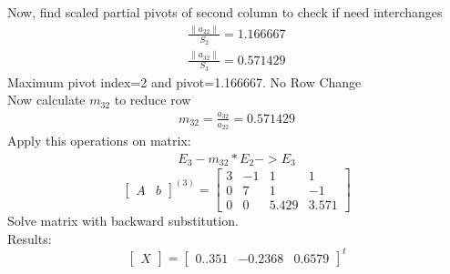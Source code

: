 \documentclass{article}
\begin{document}
Now, find scaled partial pivots of second column to check if need interchanges
\begin{align}
	\frac{\|a_{22}\|}{S_{2}}=1.166667\\
	\frac{\|a_{32}\|}{S_{3}}=0.571429
\end{align}
Maximum pivot index=2 and pivot=1.166667. No Row Change\\
Now calculate $m_{32}$ to reduce row 
\begin{align}
	m_{32}=\frac{a_{32}}{a_{22}}=0.571429
\end{align}
Apply this operations on matrix:
\begin{align}
	E_{3}-m_{32}*E_{2}->E_{3}
\end{align}
\[
\left[
\begin{array}{c|c}
A&b
\end{array}
\right]^{(3)}
=
\left[
\begin{array}{ccc|c}
	3&-1&1&1\\
	0&7&1&-1\\
	0&0&5.429&3.571 
\end{array}
\right]
\]
Solve matrix with backward substitution.\\
Results:
\[
\begin{bmatrix}
X
\end{bmatrix}
=
\begin{bmatrix}
	0..351&-0.2368&0.6579
\end{bmatrix}^t
\]
\end{document}
